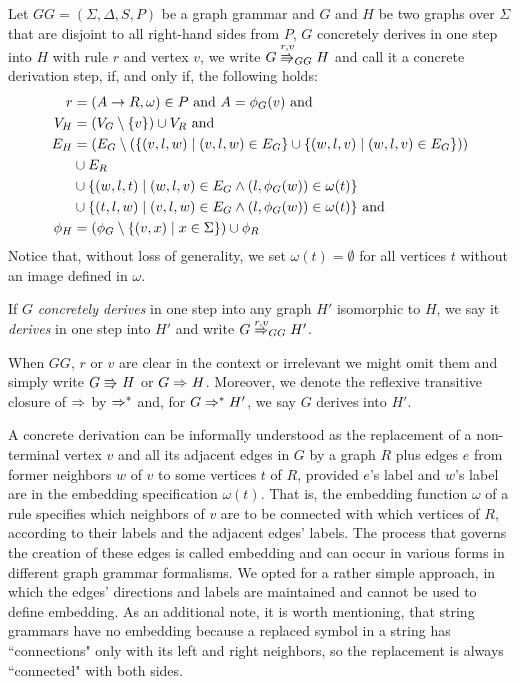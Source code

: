 \documentclass[]{report}
\begin{document}
\begin{definition}
	\label{def:gg_dstep}
	Let $GG = (\Sigma, \Delta, S, P)$ be a graph grammar and $G$ and $H$ be two graphs over $\Sigma$ that are disjoint to all right-hand sides from $P$, $G$ concretely derives in one step into $H$ with rule $r$ and vertex $v$, we write $G \cderiv{r}{v}{GG} H$ and call it a concrete derivation step, if, and only if, the following holds:
	\begin{align*}
		r & = (A \to R, \omega) \in P \text{ and } A = \phi_G(v) \text{ and} \\
		V_H  & = (V_G \setminus \{v\}) \cup V_R \text{ and} \\
		E_H & = (E_G \setminus (\{(v,l,w) \; | \; (v,l,w) \in E_G\} \cup \{(w,l,v) \; | \; (w,l,v) \in E_G\})) \\
		& \cup E_R \\
		& \cup \{(w,l,t) \; | \; (w,l,v) \in E_G \land (l,\phi_G(w)) \in \omega(t)\} \\
		& \cup \{(t,l,w) \; | \; (v,l,w) \in E_G \land (l,\phi_G(w)) \in \omega(t)\} \text{ and} \\
		\phi_H & = (\phi_G \setminus \{(v,x) \; | \; x \in \Sigma \}) \cup \phi_R
	\end{align*}
	Notice that, without loss of generality, we set $\omega(t) = \emptyset$ for all vertices $t$ without an image defined in $\omega$.
	
	If $G$ \textit{concretely derives} in one step into any graph $H'$ isomorphic to $H$, we say it \textit{derives} in one step into $H'$ and write $G \deriv{r}{v}{GG} H'$. 
	
	When $GG$, $r$ or $v$ are clear in the context or irrelevant we might omit them and simply write $G \cderiv{}{}{} H$ or $G \deriv{}{}{} H$. Moreover, we denote the reflexive transitive closure of $\deriv{}{}{}$ by $\Rightarrow^*_{}$ and, for $G \Rightarrow^*_{} H'$, we say $G$ derives into $H'$.
\end{definition}

A concrete derivation can be informally understood as the replacement of a non-terminal vertex $v$ and all its adjacent edges in $G$ by a graph $R$ plus edges $e$ from former neighbors $w$ of $v$ to some vertices $t$ of $R$, provided $e$'s label and $w$'s label are in the embedding specification $\omega(t)$. That is, the embedding function $\omega$ of a rule specifies which neighbors of $v$ are to be connected with which vertices of $R$, according to their labels and the adjacent edges' labels. The process that governs the creation of these edges is called embedding and can occur in various forms in different graph grammar formalisms. We opted for a rather simple approach, in which the edges' directions and labels are maintained and cannot be used to define embedding. As an additional note, it is worth mentioning, that string grammars have no embedding because a replaced symbol in a string has ``connections" only with its left and right neighbors, so the replacement is always ``connected" with both sides.
\end{document}
